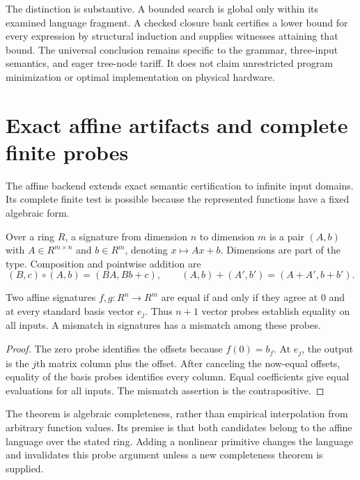 The distinction is substantive. A bounded search is global only within its examined language fragment. A checked closure bank certifies a lower bound for every expression by structural induction and supplies witnesses attaining that bound. The universal conclusion remains specific to the grammar, three-input semantics, and eager tree-node tariff. It does not claim unrestricted program minimization or optimal implementation on physical hardware.

\section{Exact affine artifacts and complete finite probes}
\label{sec:affine-semantics}

The affine backend extends exact semantic certification to infinite input domains. Its complete finite test is possible because the represented functions have a fixed algebraic form.

\begin{definition}
Over a ring $R$, a signature from dimension $n$ to dimension $m$ is a pair $(A,b)$ with $A\in R^{m\times n}$ and $b\in R^m$, denoting $x\mapsto Ax+b$. Dimensions are part of the type. Composition and pointwise addition are
\[
 (B,c)\circ(A,b)=(BA,Bb+c),\qquad
 (A,b)+(A',b')=(A+A',b+b').
\]
\end{definition}

\begin{theorem}
Two affine signatures $f,g:R^n\to R^m$ are equal if and only if they agree at $0$ and at every standard basis vector $e_j$. Thus $n+1$ vector probes establish equality on all inputs. A mismatch in signatures has a mismatch among these probes.
\end{theorem}
\begin{proof}
The zero probe identifies the offsets because $f(0)=b_f$. At $e_j$, the output is the $j$th matrix column plus the offset. After canceling the now-equal offsets, equality of the basis probes identifies every column. Equal coefficients give equal evaluations for all inputs. The mismatch assertion is the contrapositive.
\end{proof}

The theorem is algebraic completeness, rather than empirical interpolation from arbitrary function values. Its premise is that both candidates belong to the affine language over the stated ring. Adding a nonlinear primitive changes the language and invalidates this probe argument unless a new completeness theorem is supplied.

